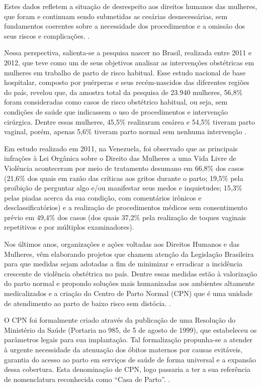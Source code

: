 Estes dados refletem a situação de desrespeito aos direitos humanos das mulheres, que foram e continuam sendo submetidas as cesárias desnecessárias, sem fundamentos coerentes sobre a necessidade dos procedimentos e a omissão dos seus riscos e complicações. \cite{soares2017violencia}.

Nessa perspectiva, salienta-se a pesquisa nascer no Brasil, realizada entre 2011 e 2012, que teve como um de seus objetivos analisar as intervenções obstétricas em mulheres em trabalho de parto de risco habitual. Esse estudo nacional de base hospitalar, composto por puérperas e seus recém-nascidos das diferentes regiões do país, revelou que, da amostra total da pesquisa de 23.940 mulheres, 56,8\% foram consideradas como casos de risco obstétrico habitual, ou seja, sem condições de saúde que indicassem o uso de procedimentos e intervenção cirúrgica. Dentre essas mulheres, 45,5\% realizaram cesárea e 54,5\% tiveram parto vaginal, porém, apenas 5,6\% tiveram parto normal sem nenhuma intervenção \cite{zanardo2017violencia}. 

Em estudo realizado em 2011, na Venezuela, foi observado que as principais infrações à Lei Orgânica sobre o Direito das Mulheres a uma Vida Livre de Violência aconteceram por meio de tratamento desumano em 66,8\% dos casos (21,6\% dos quais em razão das críticas aos gritos durante o parto; 19,5\% pela proibição de perguntar algo e/ou manifestar seus medos e inquietudes; 15,3\% pelas piadas acerca da sua condição, com comentários irônicos e desclassificatórios) e a realização de procedimentos médicos sem consentimento prévio em 49,4\% dos casos (dos quais 37,2\% pela realização de toques vaginais repetitivos e por múltiplos examinadores). \cite{rodrigues2018violencia}

Nos últimos anos, organizações e ações voltadas aos Direitos Humanos e das Mulheres, vêm elaborando projetos que chamem atenção da Legislação Brasileira para que medidas sejam adotadas a fim de minimizar e erradicar a incidência crescente de violência obstétrica no país. Dentre essas medidas estão à valorização do parto normal e propondo soluções mais humanizadas aos ambientes altamente medicalizados e a criação do Centro de Parto Normal (\acrshort{CPN}) que é uma unidade de atendimento ao parto de baixo risco sem distócia. \cite{soares2017violencia,bitencourt2004centros}.

O CPN foi formalmente criado através da publicação de uma Resolução do Ministério da Saúde (Portaria no 985, de 5 de agosto de 1999), que estabeleceu os parâmetros legais para sua implantação. Tal formalização propunha-se a atender à urgente necessidade da atenuação dos óbitos maternos por causas evitáveis, garantia do acesso ao parto em serviços de saúde de forma universal e a expansão dessa cobertura. Esta denominação de CPN, logo passaria a ter a sua referência de nomenclatura reconhecida como ``Casa de Parto''. \cite{bitencourt2004centros}.

